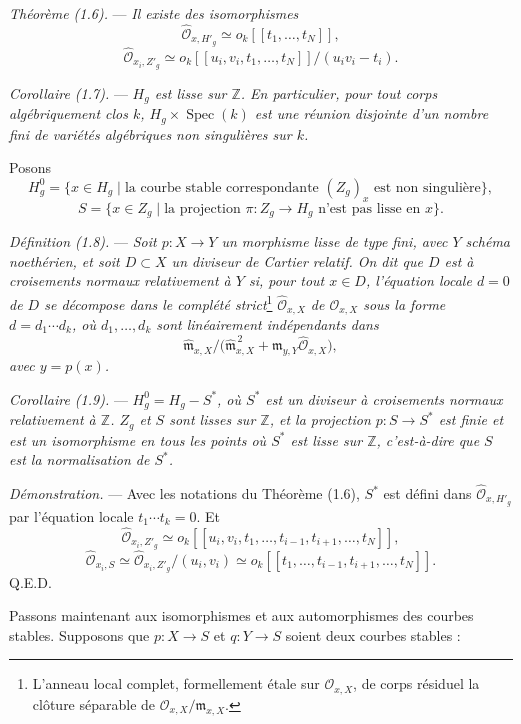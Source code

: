 \documentclass[10pt]{article}
\newcommand{\Spec}{\operatorname{Spec}}
\newcommand{\cO}{\mathcal O}
\newcommand{\QED}{\hfill Q.E.D.}
\begin{document}
\medskip
\noindent\emph{Théorème (1.6).} --- \emph{Il existe des isomorphismes}
\[
\widehat{\cO}_{x,H'_g}\simeq o_k[[t_1,\ldots,t_N]],
\]
\[
\widehat{\cO}_{x_i,Z'_g}\simeq o_k[[u_i,v_i,t_1,\ldots,t_N]]/(u_i v_i-t_i).
\]

\medskip
\noindent\emph{Corollaire (1.7).} --- \emph{$H_g$ est lisse sur $\mathbb Z$. En particulier, pour tout corps algébriquement clos $k$, $H_g\times\Spec(k)$ est une réunion disjointe d'un nombre fini de variétés algébriques non singulières sur $k$.}

Posons
\[
H_g^0=\{x\in H_g\mid \text{la courbe stable correspondante }(Z_g)_x\text{ est non singulière}\},
\]
\[
S=\{x\in Z_g\mid \text{la projection }\pi:Z_g\to H_g\text{ n'est pas lisse en }x\}.
\]

\medskip
\noindent\emph{Définition (1.8).} --- \emph{Soit $p:X\to Y$ un morphisme lisse de type fini, avec $Y$ schéma noethérien, et soit $D\subset X$ un diviseur de Cartier relatif. On dit que $D$ est à croisements normaux relativement à $Y$ si, pour tout $x\in D$, l'équation locale $d=0$ de $D$ se décompose dans le complété strict}\footnote{L'anneau local complet, formellement étale sur $\cO_{x,X}$, de corps résiduel la clôture séparable de $\cO_{x,X}/\mathfrak m_{x,X}$.}\emph{ $\widehat{\cO}_{x,X}$ de $\cO_{x,X}$ sous la forme $d=d_1\cdots d_k$, où $d_1,\ldots,d_k$ sont linéairement indépendants dans}
\[
\widehat{\mathfrak m}_{x,X}/\bigl(\widehat{\mathfrak m}_{x,X}^{\,2}+\mathfrak m_{y,Y}\widehat{\cO}_{x,X}\bigr),
\]
\emph{avec $y=p(x)$.}

\medskip
\noindent\emph{Corollaire (1.9).} --- \emph{$H_g^0=H_g-S^*$, où $S^*$ est un diviseur à croisements normaux relativement à $\mathbb Z$. $Z_g$ et $S$ sont lisses sur $\mathbb Z$, et la projection $p:S\to S^*$ est finie et est un isomorphisme en tous les points où $S^*$ est lisse sur $\mathbb Z$, c'est-à-dire que $S$ est la normalisation de $S^*$.}

\noindent\emph{Démonstration.} --- Avec les notations du Théorème (1.6), $S^*$ est défini dans $\widehat{\cO}_{x,H'_g}$ par l'équation locale $t_1\cdots t_k=0$. Et
\[
\widehat{\cO}_{x_i,Z'_g}\simeq o_k[[u_i,v_i,t_1,\ldots,t_{i-1},t_{i+1},\ldots,t_N]],
\]
\[
\widehat{\cO}_{x_i,S}\simeq \widehat{\cO}_{x_i,Z'_g}/(u_i,v_i)
\simeq o_k[[t_1,\ldots,t_{i-1},t_{i+1},\ldots,t_N]].
\]
\QED


Passons maintenant aux isomorphismes et aux automorphismes des courbes stables. Supposons que $p:X\to S$ et $q:Y\to S$ soient deux courbes stables :
\end{document}
